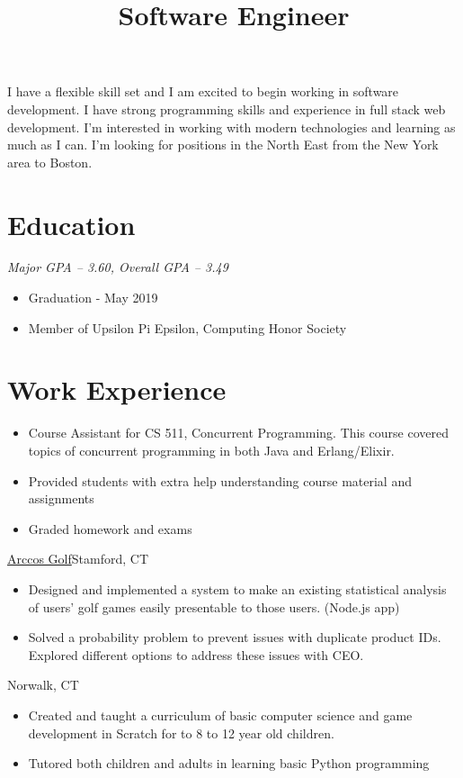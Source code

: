 \documentclass[11pt,letterpaper,roman]{moderncv}
\title{Software Engineer}
\begin{document}
\makecvtitle
\vspace*{-10mm}


{
    I have a flexible skill set and I am excited to begin working in software development.
    I have strong programming skills and experience in full stack web development.
    I'm interested in working with modern technologies and learning as much as I can.
    I'm looking for positions in the North East from the New York area to Boston.
}

\section{Education}
{
    \textit{Major GPA -- 3.60, Overall GPA -- 3.49}
    \begin{itemize}
        \item Graduation - May 2019
        \item Member of Upsilon Pi Epsilon, Computing Honor Society
    \end{itemize}
}

\section{Work Experience}
{
    \begin{itemize}
        \item Course Assistant for CS 511, Concurrent Programming. This course covered topics of
              concurrent programming in both Java and Erlang/Elixir.
        \item Provided students with extra help understanding course material and assignments
        \item Graded homework and exams
    \end{itemize}
}
{\href{http://www.arccosgolf.com/}{Arccos Golf}}{Stamford, CT}{}
{
    \begin{itemize}
        \item Designed and implemented a system to make an existing statistical analysis of users'
              golf games easily presentable to those users. (Node.js app)
        \item Solved a probability problem to prevent issues with duplicate product IDs.
              Explored different options to address these issues with CEO.
    \end{itemize}
}
{Norwalk, CT}{}
{
    \begin{itemize}
        \item Created and taught a curriculum of basic computer science and game development in
              Scratch for to 8 to 12 year old children.
        \item Tutored both children and adults in learning basic Python programming
    \end{itemize}
}
\end{document}
